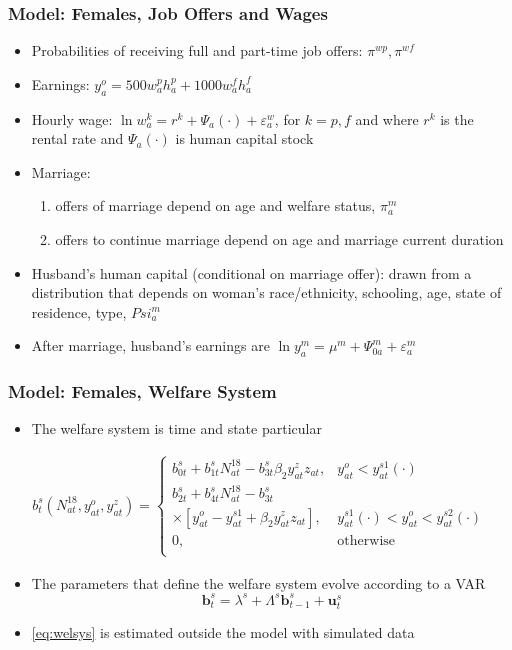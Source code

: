 \begin{frame}
	\frametitle{Model: Females, Job Offers and Wages}
	\begin{itemize}
		\item Probabilities of receiving full and part-time job offers: $\pi^{wp}, \pi^{wf}$
		\item Earnings: $y_{a}^o = 500w_{a}^ph_{a}^p + 1000w_{a}^fh_{a}^f $
		\item Hourly wage: $\ln w_{a}^k = r^k + \Psi_{a}(\cdot) + \varepsilon_{a}^{w}$, for $k = p,f$ and where $r^k$ is the rental rate and $\Psi_{a}(\cdot)$ is human capital stock
		\item Marriage: 
			\begin{enumerate}
			\item offers of marriage depend on age and welfare status, $\pi_{a}^m$
			\item offers to continue marriage depend on age and marriage current duration
			\end{enumerate}
		\item Husband's human capital (conditional on marriage offer): drawn from a distribution that depends on woman's race/ethnicity, schooling, age, state of residence, type, $Psi_{a}^m$
		\item After marriage, husband's earnings are $\ln y_{a}^m = \mu^m + \Psi_{0a}^m + \varepsilon_{a}^m$ 					
		\end{itemize}
\end{frame}

\begin{frame}
	\frametitle{Model: Females, Welfare System}
	\begin{itemize}
		\item The welfare system is time and state particular
	\end{itemize}
	\begin{eqnarray}
b_{t}^s \left( N_{at}^{18}, y_{at}^o, y_{at}^z \right) =
\begin{cases}
b_{0t}^s + b_{1t}^s N_{at}^{18} - b_{3t}^s \beta_{2} y_{at}^z z_{at}, & y_{at}^o < y_{at}^{s1}(\cdot) \nonumber \\
b_{2t}^s + b_{4t}^s N_{at}^{18} - b_{3t}^s & \nonumber \\
\times \left[ y_{at}^o - y_{at}^{s1} + \beta_{2} y_{at}^z z_{at} \right] , & y_{at}^{s1}(\cdot) < y_{at}^o < y_{at}^{s2}(\cdot) \nonumber \\
0, & \text{otherwise} \nonumber \\
\end{cases}
	\end{eqnarray}
	\begin{itemize}
	\item The parameters that define the welfare system evolve according to a VAR
		\begin{equation}
		\mathbf{b}_{t}^s = \lambda^s + \Lambda^s \mathbf{b}_{t-1}^s + \mathbf{u}_{t}^s \label{eq:welsys}
		\end{equation}
	 \item \eqref{eq:welsys} is estimated outside the model with simulated data
	\end{itemize}
\end{frame}


